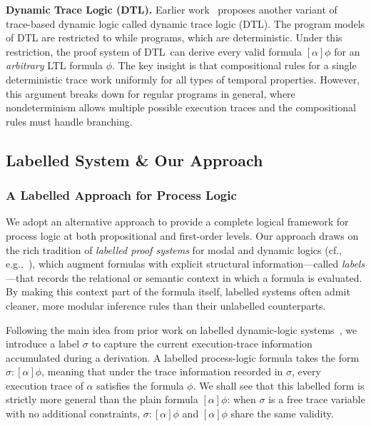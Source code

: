 \documentclass[manuscript,screen]{acmart}
\begin{document}
\textbf{Dynamic Trace Logic (DTL).} Earlier work~\cite{Beckert13} proposes another variant of trace-based dynamic logic called dynamic trace logic (DTL). 
The program models of DTL are restricted to while programs, which are deterministic. %
Under this restriction, the proof system of DTL\ can derive every valid formula $[\alpha]\phi$ for an \emph{arbitrary} LTL formula $\phi$.  The key insight is that compositional rules for a single deterministic trace work uniformly for all types of temporal properties.  However, this argument breaks down for regular programs in general, where nondeterminism allows multiple possible execution traces and the compositional rules must handle branching. 






\subsection{Labelled System \& Our Approach}
\label{section:Labelled System and Our Approach}
\subsubsection{A Labelled Approach for Process Logic}
We adopt an alternative approach to provide a complete logical framework for process logic at both propositional and first-order levels. Our approach draws on the rich tradition of \emph{labelled proof systems} for modal and dynamic logics (cf., e.g.,~\cite{Negri05,Docherty19}), which augment formulas with explicit structural information---called \emph{labels}---that records the relational or semantic context in which a formula is evaluated. By making this context part of the formula itself, labelled systems often admit cleaner, more modular inference rules than their unlabelled counterparts. 

Following the main idea from prior work on labelled dynamic-logic systems~\cite{Docherty19,Zhang25-2,zhang2025parameterizeddynamiclogic}, we introduce a label $\sigma$ to capture the current execution-trace information accumulated during a derivation. A labelled process-logic formula takes the form $\sigma : [\alpha]\phi$, meaning that under the trace information recorded in $\sigma$, every execution trace of $\alpha$ satisfies the formula $\phi$. We shall see that this labelled form is strictly more general than the plain formula $[\alpha]\phi$: when $\sigma$ is a free trace variable with no additional constraints, $\sigma : [\alpha]\phi$ and $[\alpha]\phi$ share the same validity. 
\end{document}
